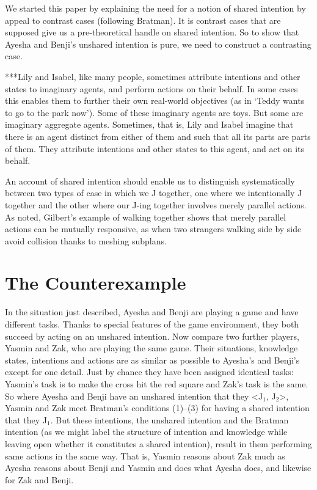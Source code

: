\documentclass[12pt,\papersize]{extarticle}
\begin{document}
We started this paper by explaining the need for a notion of shared intention by appeal to contrast cases (following Bratman). 
It is contrast cases that are supposed give us a pre-theoretical handle on shared intention.
So to show that Ayesha and Benji's unshared intention is pure, we need to construct a contrasting case.

***Lily and Isabel, 
	like many people, 
 	sometimes attribute intentions and other states to imaginary agents, and perform actions on their behalf. 
In some cases this enables them to further their own real-world objectives (as in `Teddy wants to go to the park now').	
Some of these imaginary agents are toys. 
But some are imaginary aggregate agents. 
Sometimes, that is, Lily and Isabel imagine that there is an agent distinct from either of them and such that all its parts are parts of them.
They attribute intentions and other states to this agent, and act on its behalf.






An account of shared intention should enable us to  distinguish systematically between two types of case in which we J together, one where we intentionally J together and the other where  our J-ing together involves  merely parallel actions.
As noted, Gilbert's example of walking together shows that merely parallel actions can be mutually responsive, as when two strangers walking side by side avoid collision thanks to meshing subplans.



\section{The Counterexample}

In the situation just described,
Ayesha and Benji are playing a game and have different tasks.
Thanks to special features of the game environment, they both succeed by acting on an unshared intention.
Now compare two further players, Yasmin and Zak, who are playing the same game. 
Their situations, knowledge states, intentions and actions are as similar as possible to Ayesha's and Benji's except for one detail.
Just by chance they have been assigned identical tasks: Yasmin's task is to make the cross hit the red square and Zak's task is the same.
So where Ayesha and Benji have an unshared intention that they <J$_1$, J$_2$>,
Yasmin and Zak meet Bratman's conditions (1)--(3) for having a shared intention that they J$_1$.  
But these intentions, the unshared intention and the Bratman intention (as we might label the structure of intention and knowledge while leaving open whether it constitutes a shared intention), result in them performing same actions in the same way.
That is, Yasmin reasons about Zak much as Ayesha reasons about Benji and Yasmin and does what Ayesha does, and likewise for Zak and Benji. 
\end{document}
